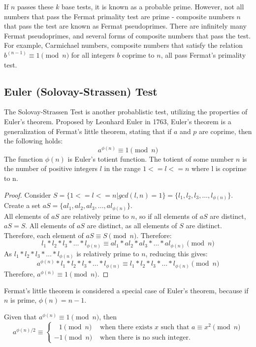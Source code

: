 \documentclass{article}
\begin{document}
If $n$ passes these $k$ base tests, it is known as a probable prime. However, not all numbers that pass the Fermat primality test are prime - composite numbers $n$ that pass the test are known as Fermat pseudoprimes. There are infinitely many Fermat pseudoprimes, and several forms of composite numbers that pass the test. For example, Carmichael numbers, composite numbers that satisfy the relation $b^{(n-1)} \equiv 1 \pmod{n}$ for all integers $b$ coprime to $n$, all pass Fermat's primality test.

\subsection{Euler (Solovay-Strassen) Test} %
The Solovay-Strassen Test is another probablistic test, utilizing the properties of Euler's theorem. Proposed by Leonhard Euler in 1763, Euler's theorem is a generalization of Fermat's little theorem, stating that if $a$ and $p$ are coprime, then the following holds:
\[
    a^{\phi(n)} \equiv 1 \pmod{n}
\]
The function $\phi(n)$ is Euler's totient function. The totient of some number $n$ is the number of positive integers $l$ in the range $1 <= l <= n$ where l is coprime to n.

\begin{proof}
    Consider $S = \{1 <= l <= n | gcd(l, n) = 1\} = \{l_1, l_2, l_3, \ldots{}, l_{\phi(n)}\}$.
    Create a set $aS = \{al_1, al_2, al_3, \ldots{}, al_{\phi(n)}\}$. \\
    All elements of $aS$ are relatively prime to $n$, so if all elements of $aS$ are distinct, $aS = S$. All elements of $aS$ are distinct, as all elements of $S$ are distinct. Therefore, each element of $aS \equiv S \pmod{n}$.
    Therefore:
    \[
        l_1 * l_2 * l_3 * \ldots{} * l_{\phi(n)} \equiv al_1 * al_2 * al_3 * \ldots{} * al_{\phi(n)} \pmod{n}
    \]
    As $l_1 * l_2 * l_3 * \ldots{} * l_{\phi(n)}$ is relatively prime to $n$, reducing this gives:
    \[
        a^{\phi(n)} * l_1 * l_2 * l_3 * \ldots{} * l_{\phi(n)} \equiv l_1 * l_2 * l_3 * \ldots{} * l_{\phi(n)} \pmod{n}
    \]
    Therefore, $a^{\phi(n)} \equiv 1 \pmod{n}$.
\end{proof}

Fermat's little theorem is considered a special case of Euler's theorem, because if $n$ is prime, $\phi(n) = n - 1$.

Given that $a^{\phi(n)} \equiv 1 \pmod{n}$, then 
\[
    a^{\phi(n) / 2} \equiv \begin{cases}
\;\;\,1\pmod{n}& \text{ when there exists }x \text{ such that }a\equiv x^2 \pmod{n}\\
     -1\pmod{n}& \text{ when there is no such integer.}
\end{cases}
\]
\end{document}
